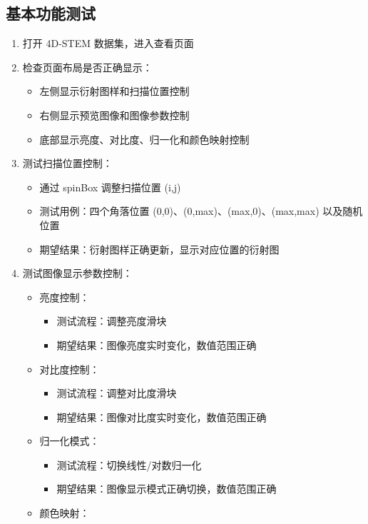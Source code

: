\documentclass[a4paper,12pt]{report}	%
\begin{document}
\subsection{基本功能测试}
\begin{enumerate}
    \item 打开 4D-STEM 数据集，进入查看页面
    \item 检查页面布局是否正确显示：
    \begin{itemize}
        \item 左侧显示衍射图样和扫描位置控制
        \item 右侧显示预览图像和图像参数控制
        \item 底部显示亮度、对比度、归一化和颜色映射控制
    \end{itemize}
    \item 测试扫描位置控制：
    \begin{itemize}
        \item 通过 spinBox 调整扫描位置 (i,j)
        \item 测试用例：四个角落位置 (0,0)、(0,max)、(max,0)、(max,max) 以及随机位置
        \item 期望结果：衍射图样正确更新，显示对应位置的衍射图
    \end{itemize}
    \item 测试图像显示参数控制：
    \begin{itemize}
        \item 亮度控制：
        \begin{itemize}
            \item 测试流程：调整亮度滑块
            \item 期望结果：图像亮度实时变化，数值范围正确
        \end{itemize}
        \item 对比度控制：
        \begin{itemize}
            \item 测试流程：调整对比度滑块
            \item 期望结果：图像对比度实时变化，数值范围正确
        \end{itemize}
        \item 归一化模式：
        \begin{itemize}
            \item 测试流程：切换线性/对数归一化
            \item 期望结果：图像显示模式正确切换，数值范围正确
        \end{itemize}
        \item 颜色映射：

\end{itemize}
\end{enumerate}
\end{document}
